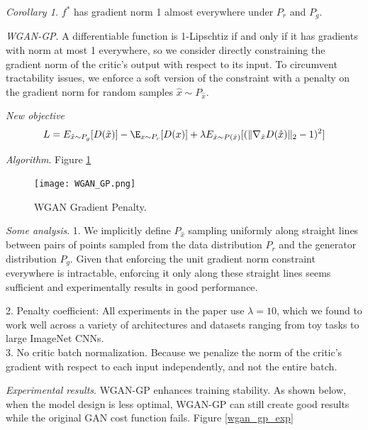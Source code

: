 \documentclass[english]{article}
\begin{document}
\item {\emph{Corollary 1.}}
$f^*$ has gradient norm 1 almost everywhere under $P_r$ and $P_g$.




\item {\emph{WGAN-GP}}.
 A differentiable function is 1-Lipschtiz if and only if it has gradients with norm at most 1 everywhere, so we consider directly constraining the gradient norm of the critic's output with respect to its input. To circumvent tractability issues, we enforce a soft version of the constraint with a penalty on the gradient norm for random samples $\hat{x}\sim P_{\hat{x}}$.




\item {\emph{New objective}}
$$L=E_{\Tilde{x}\sim P_g}[D(\Tilde{x})]-\E_{x\sim P_r}[D(x)]+\lambda E_{\hat{x}\sim P(\hat{x})}[(\|\nabla_{\hat{x}}D(\hat{x})\|_2 -1)^2]$$





\item {\emph{Algorithm}}. Figure \ref{wgan_gp}
\begin{figure}[h!]
  \centering
  \texttt{[image: WGAN\_GP.png]}
    \caption{WGAN Gradient Penalty.}
  \label{wgan_gp}
 \end{figure}




\item {\emph{Some analysis}}.
1. We implicitly define $P_{\hat{x}}$ sampling uniformly along straight lines between
pairs of points sampled from the data distribution $P_r$ and the generator distribution $P_g$. Given that enforcing the unit gradient norm constraint everywhere is intractable, enforcing it only along these straight lines seems sufficient and experimentally results in good performance.

2. Penalty coefficient: All experiments in the paper use $\lambda=10$, which we found to work well across a variety of architectures and datasets ranging from toy tasks to large ImageNet CNNs.\\
3. No critic batch normalization. Because we penalize the norm of the critic's gradient with respect to each input independently, and not the entire batch. 





\item {\emph{Experimental results}}.
WGAN-GP enhances training stability. As shown below, when the model design is less optimal, WGAN-GP can still create good results while the original GAN cost function fails. Figure \ref{wgan_gp_exp}
\end{document}
